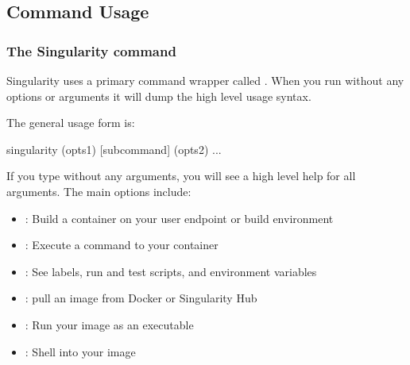 \documentclass[letterpaper,10pt,english]{sphinxmanual}
\begin{document}
\subsection{Command Usage}
\label{\detokenize{appendix:command-usage}}\label{\detokenize{appendix:id30}}

\subsubsection{The Singularity command}
\label{\detokenize{appendix:the-singularity-command}}\label{\detokenize{appendix:sec-commandlineinterface}}
Singularity uses a primary command wrapper called . When you run 
without any options or arguments it will dump the high level usage
syntax.

The general usage form is:

%
\begin{sphinxVerbatim}[commandchars=\\\{\}]
\PYGZdl{} singularity (opts1) [subcommand] (opts2) ...
\end{sphinxVerbatim}

If you type  without any arguments, you will see a high
level help for all arguments. The main options include:
\begin{itemize}
\item {} 
{\hyperref[\detokenize{appendix:build-command}]{}} : Build a container on your user endpoint or build environment

\item {} 
{\hyperref[\detokenize{appendix:exec-command}]{}} : Execute a command to your container

\item {} 
{\hyperref[\detokenize{appendix:inspect-command}]{}} : See labels, run and test scripts, and environment variables

\item {} 
{\hyperref[\detokenize{appendix:pull-command}]{}} : pull an image from Docker or Singularity Hub

\item {} 
{\hyperref[\detokenize{appendix:run-command}]{}} : Run your image as an executable

\item {} 
{\hyperref[\detokenize{appendix:shell-command}]{}} : Shell into your image

\end{itemize}
\end{document}
